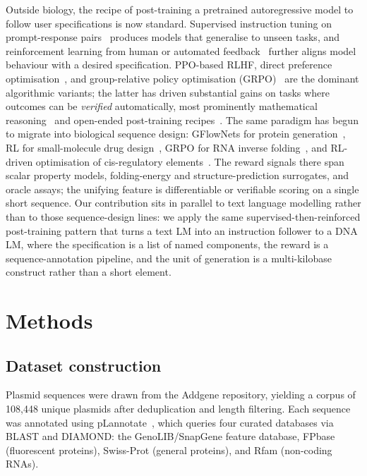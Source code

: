 \documentclass{article}
\begin{document}
Outside biology, the recipe of post-training a pretrained autoregressive model to follow
user specifications is now standard. Supervised instruction tuning on prompt-response
pairs~\citep{wei2022flan} produces models that generalise to unseen tasks, and
reinforcement learning from human or automated
feedback~\citep{christiano2017preferences,stiennon2020summarization,ouyang2022instructgpt}
further aligns model behaviour with a desired specification. PPO-based RLHF, direct
preference optimisation~\citep{rafailov2023dpo}, and group-relative policy optimisation
(GRPO)~\citep{shao2024deepseekmath} are the dominant algorithmic variants; the latter
has driven substantial gains on tasks where outcomes can be \emph{verified}
automatically, most prominently mathematical
reasoning~\citep{shao2024deepseekmath,lightman2024prm} and open-ended post-training
recipes~\citep{lambert2024tulu}. The same paradigm has begun to migrate into biological
sequence design: GFlowNets for protein generation~\citep{jain2022gflownet},
RL for small-molecule drug design~\citep{zhou2023molrl}, GRPO for RNA inverse
folding~\citep{yangheng2024rnagrpo}, and RL-driven optimisation of cis-regulatory
elements~\citep{taskiran2024cre}. The reward signals there span scalar property models,
folding-energy and structure-prediction surrogates, and oracle assays; the unifying
feature is differentiable or verifiable scoring on a single short sequence. Our
contribution sits in parallel to text language modelling rather than to those
sequence-design lines: we apply the same supervised-then-reinforced post-training
pattern that turns a text LM into an instruction follower to a DNA LM, where the
specification is a list of named components, the reward is a sequence-annotation
pipeline, and the unit of generation is a multi-kilobase construct rather than a short
element.

\section{Methods}
\label{sec:methods}

\subsection{Dataset construction}
\label{sec:data}

Plasmid sequences were drawn from the Addgene repository, yielding a corpus of 108,448
unique plasmids after deduplication and length filtering. Each sequence was annotated
using pLannotate~\citep{mcguffie2021plannotate}, which queries four curated databases via
BLAST and DIAMOND: the GenoLIB/SnapGene feature database, FPbase (fluorescent proteins),
Swiss-Prot (general proteins), and Rfam (non-coding RNAs).
\end{document}
